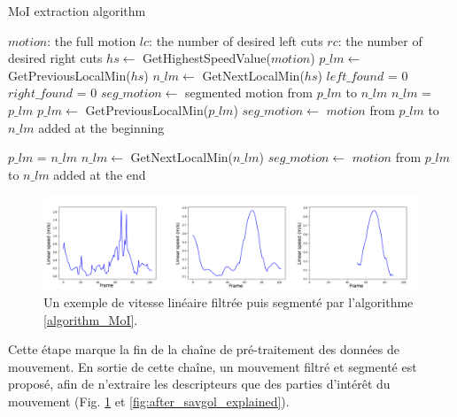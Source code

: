 \begin{algorithm}
\caption{MoI extraction algorithm}
\begin{algorithmic}[1]
\State $motion$: the full motion
\State $lc$: the number of desired left cuts
\State $rc$: the number of desired right cuts
	\State $hs \gets$ GetHighestSpeedValue($motion$)
    \State $p\_lm \gets$ GetPreviousLocalMin($hs$)
    \State $n\_lm \gets$ GetNextLocalMin($hs$)
    \State $left\_found$ = 0
    \State $right\_found$ = 0
    \State $seg\_motion \gets$ segmented motion from $p\_lm$ to $n\_lm$
          \State $n\_lm$ = $p\_lm$
          \State $p\_lm \gets$ GetPreviousLocalMin($p\_lm$)
          \State $seg\_motion \gets$ $motion$ from $p\_lm$ to $n\_lm$ added at the beginning
  	\EndWhile

          \State $p\_lm$ = $n\_lm$
          \State $n\_lm \gets$ GetNextLocalMin($n\_lm$)
          \State $seg\_motion \gets$ $motion$ from $p\_lm$ to $n\_lm$ added at the end
  	\EndWhile

 \EndProcedure
 \end{algorithmic}
 \label{algorithm_MoI}
\end{algorithm}

\begin{figure}
	\centering
    \includegraphics[width=\textwidth]{pictures/speed_values_all.png}
    \caption[Vitesse linéaire filtrée et segmentée]{Un exemple de vitesse linéaire filtrée puis segmenté par l'algorithme \ref{algorithm_MoI}.}
    \label{fig:speed_values_all}
\end{figure}

Cette étape marque la fin de la chaîne de pré-traitement des données de mouvement. En sortie de cette chaîne, un mouvement filtré et segmenté est proposé, afin de n'extraire les descripteurs que des parties d'intérêt du mouvement (Fig. \ref{fig:speed_values_all} et \ref{fig:after_savgol_explained}).

